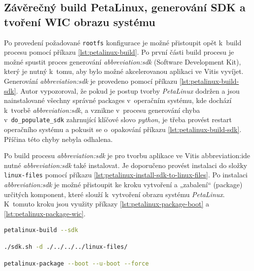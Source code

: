 \documentclass[a4paper, twoside, 11pt]{article}
\begin{document}
	\subsection{Závěrečný build PetaLinux, generování SDK a tvoření WIC obrazu systému}
	Po provedení požadované \texttt{rootfs} konfigurace je možné přistoupit opět k~build procesu pomocí příkazu \ref{lst:petalinux-build}. Po první části build procesu je možné spustit proces generování \textit{\gls{abbreviation:sdk}} (Software Development Kit), který je nutný k~tomu, aby bylo možné akcelerovanou aplikaci ve Vitis vyvíjet. Generování \textit{\gls{abbreviation:sdk}} je provedeno pomocí příkazu \ref{lst:petalinux-build-sdk}. Autor vypozoroval, že pokud je postup tvorby \textit{PetaLinux} dodržen a jsou nainstalované všechny správné packages v~operačním systému, kde dochází k~tvorbě \textit{\gls{abbreviation:sdk}}, a vznikne v~procesu generování chyba v~\texttt{do\_populate\_sdk} zahrnující klíčové slovo \textit{python}, je třeba provést restart operačního systému a pokusit se o~opakování příkazu \ref{lst:petalinux-build-sdk}. Příčina této chyby nebyla odhalena.\par
	Po build procesu \textit{\gls{abbreviation:sdk}} je pro tvorbu aplikace ve Vitis \gls{abbreviation:ide} nutné \textit{\gls{abbreviation:sdk}} také instalovat. Je doporučeno provést instalaci do složky \texttt{linux-files} pomocí příkazu \ref{lst:petalinux-install-sdk-to-linux-files}.
	Po instalaci \textit{\gls{abbreviation:sdk}} je možné přistoupit ke kroku vytvoření a „zabalení“ (package) určitých komponent, které slouží k~vytvoření obrazu systému \textit{PetaLinux}. K~tomuto kroku jsou využity příkazy \ref{lst:petalinux-package-boot} a \ref{lst:petalinux-package-wic}.\par


\begin{lstlisting}[language={sh}, caption={Příkaz pro aktivování build procesu SDK}, label= {lst:petalinux-build-sdk}, morekeywords={petalinux-build, petalinux-package, petalinux-config}]
petalinux-build --sdk\end{lstlisting}

\begin{lstlisting}[language={sh}, caption={Příkaz pro inslataci SDK}, label= {lst:petalinux-install-sdk-to-linux-files}, morekeywords={petalinux-build, petalinux-package, petalinux-config}]
./sdk.sh -d ./../../../linux-files/\end{lstlisting}

\begin{lstlisting}[language={sh}, caption={Příkaz pro zabalení boot komponent pro tvorbu obrazu systému.}, label= {lst:petalinux-package-boot}, morekeywords={petalinux-build, petalinux-package, petalinux-config}]
petalinux-package --boot --u-boot --force\end{lstlisting}
\end{document}
